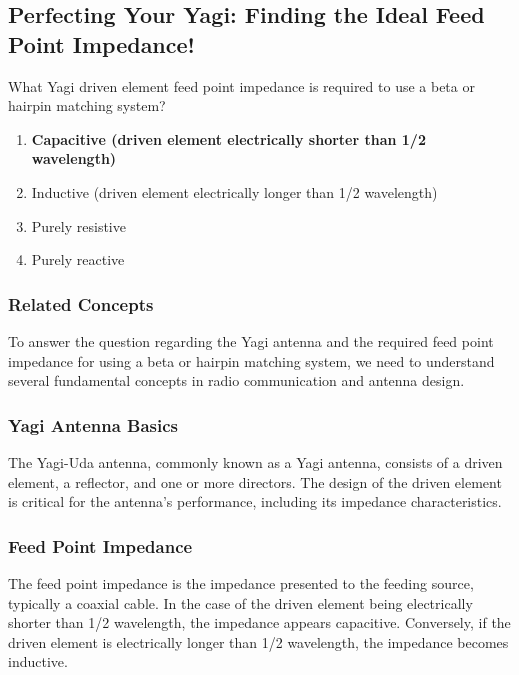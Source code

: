 \subsection{Perfecting Your Yagi: Finding the Ideal Feed Point Impedance!}

\begin{tcolorbox}[colback=gray!10, colframe=black, title=E9E05]
What Yagi driven element feed point impedance is required to use a beta or hairpin matching system? 

\begin{enumerate}[label=\Alph*.]
    \item \textbf{Capacitive (driven element electrically shorter than 1/2 wavelength)}
    \item Inductive (driven element electrically longer than 1/2 wavelength)
    \item Purely resistive
    \item Purely reactive
\end{enumerate} \end{tcolorbox}

\subsubsection*{Related Concepts}

To answer the question regarding the Yagi antenna and the required feed point impedance for using a beta or hairpin matching system, we need to understand several fundamental concepts in radio communication and antenna design.

\subsubsection*{Yagi Antenna Basics}

The Yagi-Uda antenna, commonly known as a Yagi antenna, consists of a driven element, a reflector, and one or more directors. The design of the driven element is critical for the antenna's performance, including its impedance characteristics. 

\subsubsection*{Feed Point Impedance}

The feed point impedance is the impedance presented to the feeding source, typically a coaxial cable. In the case of the driven element being electrically shorter than 1/2 wavelength, the impedance appears capacitive. Conversely, if the driven element is electrically longer than 1/2 wavelength, the impedance becomes inductive. 

